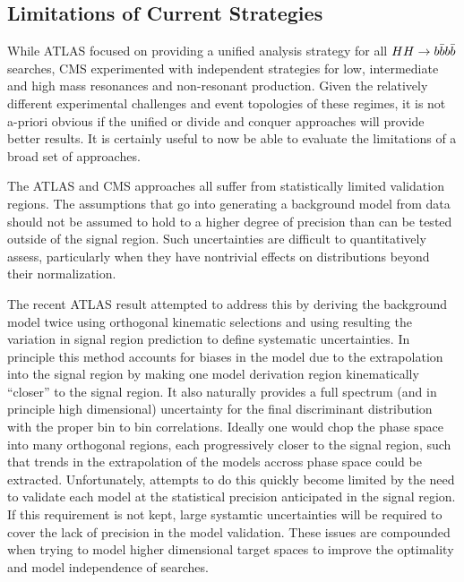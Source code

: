 \subsection{Limitations of Current Strategies}
\label{sec:limitations4b}

While ATLAS focused on providing a unified analysis strategy for all $HH\rightarrow b\bar{b}b\bar{b}$ searches,
CMS experimented with independent strategies for low, intermediate and high mass resonances and non-resonant production.
Given the relatively different experimental challenges and event topologies of these regimes, it is not a-priori obvious if the unified or divide and conquer approaches will provide better results.
It is certainly useful to now be able to evaluate the limitations of a broad set of approaches. 

The ATLAS and CMS approaches all suffer from statistically limited validation regions.
The assumptions that go into generating a background model from data should not be assumed to hold to a higher degree of precision than can be tested outside of the signal region.
Such uncertainties are difficult to quantitatively assess, particularly when they have nontrivial effects on distributions beyond their normalization.

The recent ATLAS result \cite{Aaboud:2018knk,Bryant:2644551} attempted to address this by deriving the background model twice
using orthogonal kinematic selections and using resulting the variation in signal region prediction to define systematic uncertainties.
In principle this method accounts for biases in the model due to the extrapolation into the signal region by making one model derivation region kinematically ``closer'' to the signal region.
It also naturally provides a full spectrum (and in principle high dimensional) uncertainty for the final discriminant distribution with the proper bin to bin correlations.
Ideally one would chop the phase space into many orthogonal regions, each progressively closer to the signal region, such that trends in the extrapolation of the models accross phase space could be extracted.
Unfortunately, attempts to do this quickly become limited by the need to validate each model at the statistical precision anticipated in the signal region.
If this requirement is not kept, large systamtic uncertainties will be required to cover the lack of precision in the model validation. 
These issues are compounded when trying to model higher dimensional target spaces to improve the optimality and model independence of searches.

